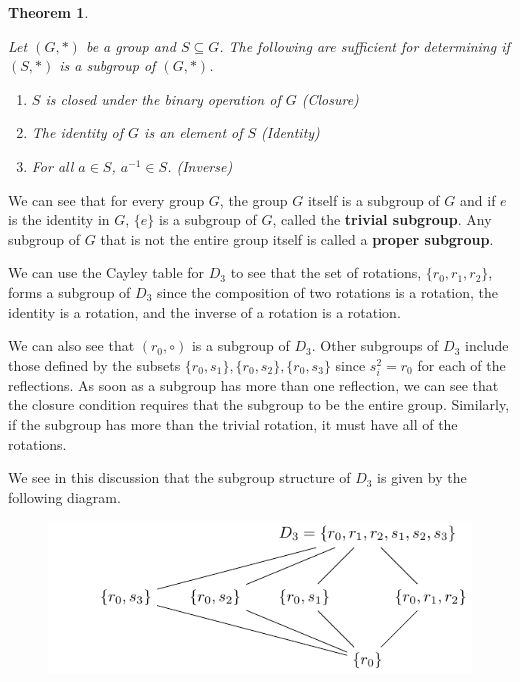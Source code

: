 \documentclass[
]{book}
\providecommand{\tightlist}{%
  \setlength{\itemsep}{0pt}\setlength{\parskip}{0pt}}
\newtheorem{theorem}{Theorem}[chapter]
\theoremstyle{definition}
\theoremstyle{definition}
\theoremstyle{definition}
\theoremstyle{definition}
\theoremstyle{remark}
\begin{document}
\begin{theorem}
\protect\hypertarget{thm:unlabeled-div-216}{}\label{thm:unlabeled-div-216}

Let \((G,*)\) be a group and \(S \subseteq G\). The following are sufficient for determining if \((S,*)\) is a subgroup of \((G,*)\).

\begin{enumerate}
\def\labelenumi{\arabic{enumi}.}
\tightlist
\item
  \(S\) is closed under the binary operation of \(G\) (Closure)
\item
  The identity of \(G\) is an element of \(S\) (Identity)
\item
  For all \(a\in S\), \(a^{-1}\in S\). (Inverse)
\end{enumerate}

\end{theorem}

We can see that for every group \(G\), the group \(G\) itself is a subgroup of \(G\) and if \(e\) is the identity in \(G\), \(\{e\}\) is a subgroup of \(G\), called the \textbf{trivial subgroup}. Any subgroup of \(G\) that is not the entire group itself is called a \textbf{proper subgroup}.

We can use the Cayley table for \(D_3\) to see that the set of rotations, \(\{r_0, r_1, r_2\}\), forms a subgroup of \(D_3\) since the composition of two rotations is a rotation, the identity is a rotation, and the inverse of a rotation is a rotation.

We can also see that \(({r_0},\circ)\) is a subgroup of \(D_3\). Other subgroups of \(D_3\) include those defined by the subsets \(\{r_0,s_1\}, \{r_0, s_2\}, \{r_0, s_3\}\) since \(s_i^2=r_0\) for each of the reflections. As soon as a subgroup has more than one reflection, we can see that the closure condition requires that the subgroup to be the entire group. Similarly, if the subgroup has more than the trivial rotation, it must have all of the rotations.

We see in this discussion that the subgroup structure of \(D_3\) is given by the following diagram.

\begin{figure}

{\centering \includegraphics[width=0.8\linewidth]{tikz/dihedral_subgroups} 

}

\end{figure}
\end{document}

